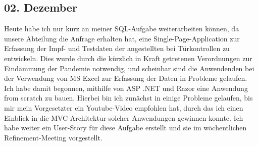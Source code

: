 \subsection{02. Dezember}
Heute habe ich nur kurz an meiner SQL-Aufgabe weiterarbeiten können, da unsere Abteilung die Anfrage erhalten hat, eine Single-Page-Application zur Erfassung der Impf- und Testdaten der angestellten bei Türkontrollen zu entwickeln. Dies wurde durch die kürzlich in Kraft getretenen Verordnungen zur Eindämmung der Pandemie notwendig, und scheinbar sind die Anwendenden bei der Verwendung von MS Excel zur Erfassung der Daten in Probleme gelaufen. Ich habe damit begonnen, mithilfe von ASP .NET und Razor eine Anwendung from scratch zu bauen. Hierbei bin ich zunächst in einige Probleme gelaufen, bis mir mein Vorgesetzter ein Youtube-Video empfohlen hat, durch das ich einen Einblick in die MVC-Architektur solcher Anwendungen gewinnen konnte. Ich habe weiter ein User-Story für diese Aufgabe erstellt und sie im  wöchentlichen Refinement-Meeting vorgestellt.